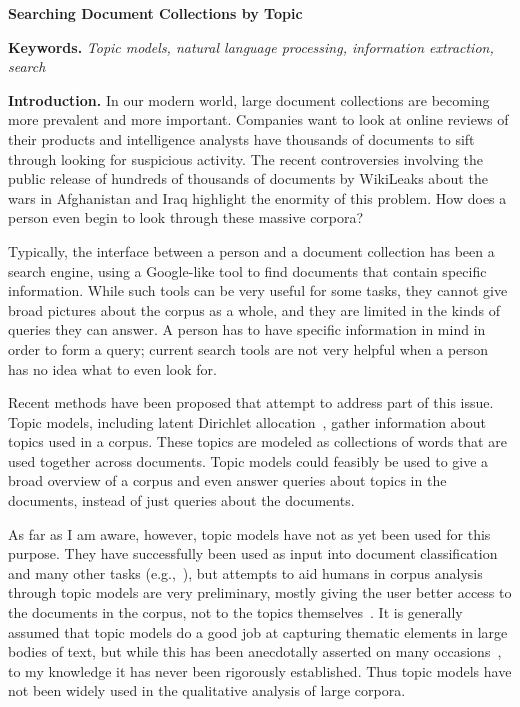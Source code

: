 \documentclass[onecolumn, 12pt]{article}
\begin{document}
\pagestyle{empty}

\begin{center}
  \textbf{Searching Document Collections by Topic}
\end{center}
\vspace{-4mm}

\textbf{Keywords.} \textit{Topic models, natural language processing,
information extraction, search}

\textbf{Introduction.}  In our modern world, large document collections are
becoming more prevalent and more important.  Companies want to look at online
reviews of their products and intelligence analysts have thousands of documents
to sift through looking for suspicious activity.  The recent controversies
involving the public release of hundreds of thousands of documents by WikiLeaks
about the wars in Afghanistan and Iraq highlight the enormity of this problem.
How does a person even begin to look through these massive corpora?

Typically, the interface between a person and a document collection has been a
search engine, using a Google-like tool to find documents that contain specific
information.  While such tools can be very useful for some tasks, they cannot
give broad pictures about the corpus as a whole, and they are limited in the
kinds of queries they can answer.  A person has to have specific information in
mind in order to form a query; current search tools are not very helpful when a
person has no idea what to even look for.

Recent methods have been proposed that attempt to address part of this issue.
Topic models, including latent Dirichlet
allocation~\cite{blei-2003-latent-dirichlet-allocation}, gather information
about topics used in a corpus.  These topics are modeled as collections of
words that are used together across documents.  Topic models could feasibly be
used to give a broad overview of a corpus and even answer queries about topics
in the documents, instead of just queries about the documents.

As far as I am aware, however, topic models have not as yet been used for this
purpose.  They have successfully been used as input into document
classification and many other tasks
(e.g.,~\cite{blei-2008-supervised-topic-models}), but attempts to aid humans in
corpus analysis through topic models are very preliminary, mostly giving the
user better access to the documents in the corpus, not to the topics
themselves~\cite{newman-2010-visualizing-with-topic-maps}.  It is generally
assumed that topic models do a good job at capturing thematic elements in large
bodies of text, but while this has been anecdotally asserted on many
occasions~\cite{griffiths-2004-finding-scientific-topics}, to my knowledge it
has never been rigorously established.  Thus topic models have not been widely
used in the qualitative analysis of large corpora.
\end{document}
